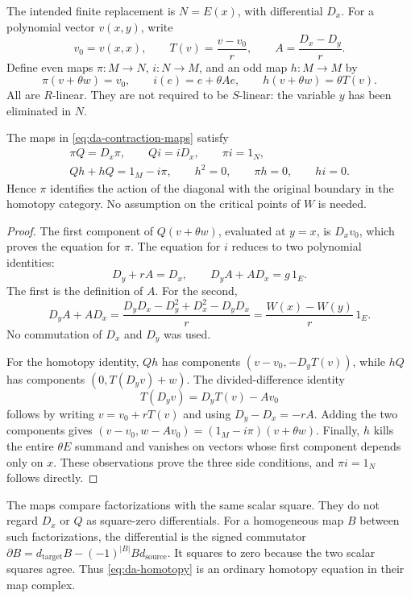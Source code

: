 The intended finite replacement is \(N=E(x)\), with differential
\(D_x\). For a polynomial vector \(v(x,y)\), write
\[
 v_0=v(x,x),\qquad
 T(v)=\frac{v-v_0}{r},\qquad
 A=\frac{D_x-D_y}{r}.
\]
Define even maps
\(\pi:M\to N\), \(i:N\to M\), and an odd map \(h:M\to M\) by
\begin{equation}
 \pi(v+\theta w)=v_0,\qquad
 i(e)=e+\theta Ae,\qquad
 h(v+\theta w)=\theta T(v).
 \label{eq:da-contraction-maps}
\end{equation}
All are \(R\)-linear. They are not required to be \(S\)-linear:
the variable \(y\) has been eliminated in \(N\).

\begin{theorem}
\label{thm:da-one-contraction}
The maps in \eqref{eq:da-contraction-maps} satisfy
\begin{gather}
 \pi Q=D_x\pi,\qquad Qi=iD_x,\qquad \pi i=1_N,
 \label{eq:da-chain-maps}\\
 Qh+hQ=1_M-i\pi,\qquad
 h^2=0,\qquad \pi h=0,\qquad hi=0.
 \label{eq:da-homotopy}
\end{gather}
Hence \(\pi\) identifies the action of the diagonal with the
original boundary in the homotopy category.
No assumption on the critical points of \(W\) is needed.
\end{theorem}
\begin{proof}
The first component of \(Q(v+\theta w)\), evaluated at \(y=x\),
is \(D_xv_0\), which proves the equation for \(\pi\).
The equation for \(i\) reduces to two polynomial identities:
\[
 D_y+rA=D_x,\qquad D_yA+AD_x=g\,1_E.
\]
The first is the definition of \(A\). For the second,
\[
 D_yA+AD_x
 =\frac{D_yD_x-D_y^2+D_x^2-D_yD_x}{r}
 =\frac{W(x)-W(y)}r\,1_E .
\]
No commutation of \(D_x\) and \(D_y\) was used.

For the homotopy identity, \(Qh\) has components
\((v-v_0,-D_yT(v))\), while \(hQ\) has components
\((0,T(D_yv)+w)\).
The divided-difference identity
\[
 T(D_yv)=D_yT(v)-Av_0
\]
follows by writing \(v=v_0+rT(v)\) and using \(D_y-D_x=-rA\).
Adding the two components gives
\((v-v_0,w-Av_0)=(1_M-i\pi)(v+\theta w)\).
Finally, \(h\) kills the entire \(\theta E\) summand and vanishes
on vectors whose first component depends only on \(x\).
These observations prove the three side conditions, and
\(\pi i=1_N\) follows directly.
\end{proof}

The maps compare factorizations with the same scalar square.
They do not regard \(D_x\) or \(Q\) as square-zero differentials.
For a homogeneous map \(B\) between such factorizations, the
differential is the signed commutator
\(\partial B=d_{\mathrm{target}}B-(-1)^{|B|}Bd_{\mathrm{source}}\).
It squares to zero because the two scalar squares agree.
Thus \eqref{eq:da-homotopy} is an ordinary homotopy equation in
their map complex.

